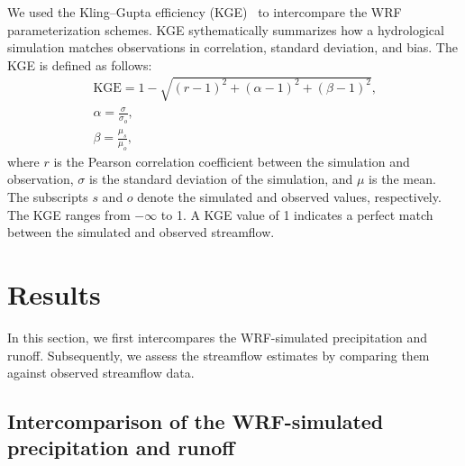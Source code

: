 \documentclass[draft]{agujournal2019}
\begin{document}
We used the Kling--Gupta efficiency (KGE)~\cite{gupta2009JH} to intercompare the WRF parameterization schemes. KGE sythematically summarizes how a hydrological simulation matches observations in correlation, standard deviation, and bias. The KGE is defined as follows:
\begin{eqnarray}
  \textrm{KGE} = 1 - \sqrt{\left(r - 1\right)^2 + \left(\alpha  - 1\right)^2 + \left(\beta - 1\right)^2} \textrm{,} \\
  \alpha  = \frac{\sigma}{\sigma_o} \textrm{,}                                                                 \\
  \beta = \frac{\mu_s}{\mu_o} \textrm{,}
\end{eqnarray}
where $r$ is the Pearson correlation coefficient between the simulation and observation, $\sigma$ is the standard deviation of the simulation, and $\mu$ is the mean. The subscripts $s$ and $o$ denote the simulated and observed values, respectively. The KGE ranges from $-\infty$ to 1. A KGE value of 1 indicates a perfect match between the simulated and observed streamflow.

\section{Results}\label{sec:results}

In this section, we first intercompares the WRF-simulated precipitation and runoff. Subsequently, we assess the streamflow estimates by comparing them against observed streamflow data.

\subsection{Intercomparison of the WRF-simulated precipitation and runoff}
\end{document}
